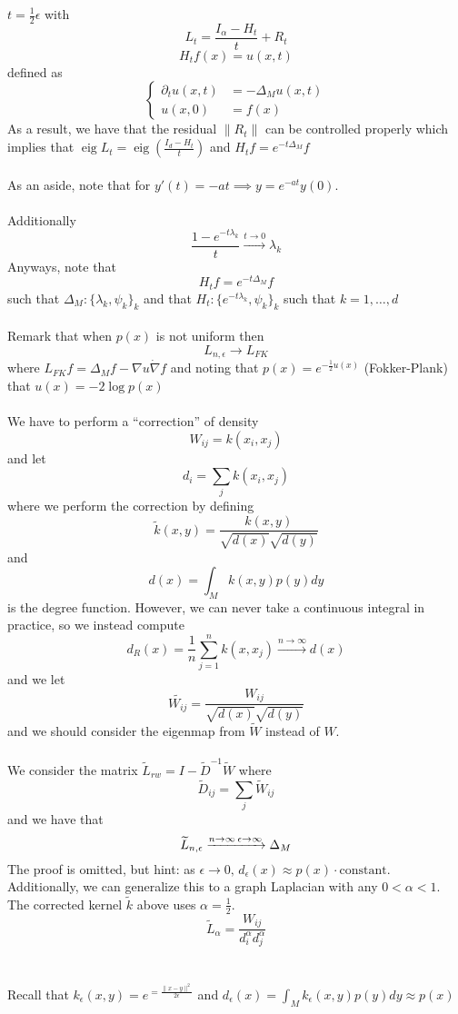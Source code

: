\documentclass[12pt]{article}
\theoremstyle{plain}
\DeclareMathOperator*{\eig}{eig}
\begin{document}
$ t = \frac{1}{2} \epsilon $
with
\[
L_t = \frac{I_{\alpha} - H_t}{t} + R_t
\]
\[
H_t f(x) = u(x, t)
\]
defined as
\[
\begin{cases}
    \partial_t u(x, t) &= -\Delta_M u(x, t) \\
    u(x, 0) &= f(x)
\end{cases}
\]
As a result, we have that the residual $ \| R_t \| $ can be controlled properly
which implies that $ \eig{L_t} = \eig{( \frac{I_d - H_t}{t} )} $
and $ H_t f = e^{-t \Delta_M} f $
\\ \\
As an aside, note that for $ y'(t) = -at \implies y = e^{-at} y(0) $.
\\ \\
Additionally
\[
\frac{1 - e^{-t\lambda_k}}{t} \xrightarrow{t \to 0} \lambda_k
\]
Anyways, note that
\[
H_t f = e^{-t \Delta_M} f
\]
such that $ \Delta_M : \{ \lambda_k, \psi_k \}_k $
and that $ H_t : \{ e^{-t \lambda_k}, \psi_k \}_k $
such that $ k = 1, \ldots, d $
\\ \\
Remark that when $ p(x) $ is not uniform then
\[
L_{n, \epsilon} \to L_{FK}
\]
where $ L_{FK} f = \Delta_M f - \nabla u \dot \nabla f $
and noting that $ p(x) = e^{-\frac{1}{2} u(x)} $
(Fokker-Plank) that $ u(x) = -2 \log{p(x)} $
\\ \\
We have to perform a ``correction'' of density
\[
W_{ij} = k(x_i, x_j)
\]
and let
\[
d_i = \sum_{j} k(x_i, x_j)
\]
where we perform the correction by defining
\[
\widetilde{k} (x, y) = \frac{k(x, y)}{\sqrt{d(x)} \sqrt{d(y)}}
\]
and
\[
d(x) = \int_M k(x, y) p(y) dy
\]
is the degree function. However, we can never take a continuous integral in practice, so we instead compute
\[
d_R (x) = \frac{1}{n} \sum_{j = 1}^n k(x, x_j) \xrightarrow{n \to \infty} d(x)
\]
and we let
\[
\widetilde{W_{ij}} = \frac{W_{ij}}{\sqrt{d(x)} \sqrt{d(y)}}
\]
and we should consider the eigenmap from $ \widetilde{W} $ instead of $ W $.
\\ \\
We consider the matrix $ \widetilde{L}_{rw} = I - \widetilde{D}^{-1} \widetilde{W} $ where
\[
\widetilde{D}_{ij} = \sum_j \widetilde{W}_{ij}
\]
and we have that
\[
\widetilde{L}_{n, \epsilon} \xrightarrow{n \to \infty \\ \epsilon \to \infty} \Delta_M
\]
The proof is omitted, but hint: as $ \epsilon \to 0, \, d_{\epsilon} (x) \approx p(x) \cdot \text{constant} $.
Additionally, we can generalize this to a graph Laplacian with any $0 < \alpha < 1$. The corrected kernel $\widetilde{k}$ above uses $\alpha = \frac{1}{2}$.
\[
\widetilde{L}_{\alpha} = \frac{W_{ij}}{d_i^{\alpha} d_j^{\alpha}}
\]
\\ \\
Recall that $k_{\epsilon} (x, y) = e^{= \frac{\| x - y \|^2}{2 \epsilon}}$ and $d_{\epsilon} (x) = \int_M k_{\epsilon} (x, y) p(y) dy \approx p(x)$
\\ \\
\end{document}
